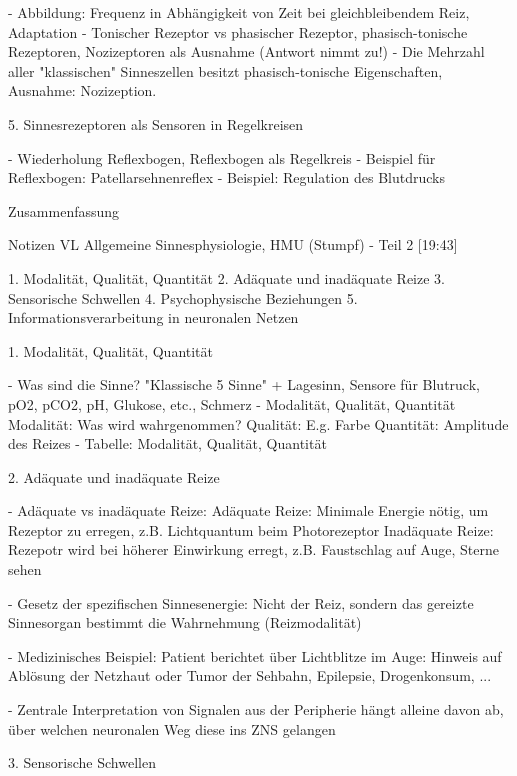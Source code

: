 - Abbildung: Frequenz in Abhängigkeit von Zeit bei gleichbleibendem Reiz, Adaptation
- Tonischer Rezeptor vs phasischer Rezeptor, phasisch-tonische Rezeptoren, Nozizeptoren als Ausnahme (Antwort nimmt zu!)
- Die Mehrzahl aller "klassischen" Sinneszellen besitzt phasisch-tonische Eigenschaften, Ausnahme: Nozizeption.


5. Sinnesrezeptoren als Sensoren in Regelkreisen

- Wiederholung Reflexbogen, Reflexbogen als Regelkreis
- Beispiel für Reflexbogen: Patellarsehnenreflex
- Beispiel: Regulation des Blutdrucks

Zusammenfassung


Notizen VL Allgemeine Sinnesphysiologie, HMU (Stumpf) - Teil 2 [19:43]

 
1. Modalität, Qualität, Quantität
2. Adäquate und inadäquate Reize
3. Sensorische Schwellen
4. Psychophysische Beziehungen
5. Informationsverarbeitung in neuronalen Netzen

1. Modalität, Qualität, Quantität

- Was sind die Sinne? "Klassische 5 Sinne" + Lagesinn, Sensore für Blutruck, pO2, pCO2, pH, Glukose, etc., Schmerz
- Modalität, Qualität, Quantität
    Modalität: Was wird wahrgenommen? 
    Qualität: E.g. Farbe
    Quantität: Amplitude des Reizes
- Tabelle: Modalität, Qualität, Quantität

2. Adäquate und inadäquate Reize

- Adäquate vs inadäquate Reize:
    Adäquate Reize: Minimale Energie nötig, um Rezeptor zu erregen, z.B. Lichtquantum beim Photorezeptor
    Inadäquate Reize: Rezepotr wird bei höherer Einwirkung erregt, z.B. Faustschlag auf Auge, Sterne sehen 

- Gesetz der spezifischen Sinnesenergie:
    Nicht der Reiz, sondern das gereizte Sinnesorgan bestimmt die Wahrnehmung (Reizmodalität)
    
- Medizinisches Beispiel: Patient berichtet über Lichtblitze im Auge: Hinweis auf Ablösung der Netzhaut oder Tumor der Sehbahn, Epilepsie, Drogenkonsum, ...
    
- Zentrale Interpretation von Signalen aus der Peripherie hängt alleine davon ab, über welchen neuronalen Weg diese ins ZNS gelangen
    


3. Sensorische Schwellen

